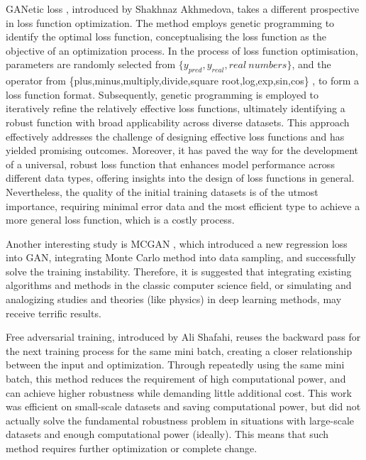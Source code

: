\documentclass{article}
\begin{document}
GANetic loss \cite{akhmedova2024ganeticlossgenerativeadversarial}, introduced by Shakhnaz Akhmedova, takes a different prospective in loss function optimization. The method employs genetic programming to identify the optimal loss function, conceptualising the loss function as the objective of an optimization process. In the process of loss function optimisation, parameters are randomly selected from $\{y_{pred}, y_{real}, real\ numbers\}$, and the operator from \{plus,minus,multiply,divide,square root,log,exp,sin,cos\} , to form a loss function format. Subsequently, genetic programming is employed to iteratively refine the relatively effective loss functions, ultimately identifying a robust function with broad applicability across diverse datasets. This approach effectively addresses the challenge of designing effective loss functions and has yielded promising outcomes. Moreover, it has paved the way for the development of a universal, robust loss function that enhances model performance across different data types, offering insights into the design of loss functions in general. Nevertheless, the quality of the initial training datasets is of the utmost importance, requiring minimal error data and the most efficient type to achieve a more general loss function, which is a costly process.

Another interesting study is MCGAN \cite{xiao2024mcganenhancinggantraining}, which introduced a new regression loss into GAN, integrating Monte Carlo method into data sampling, and successfully solve the training instability. Therefore, it is suggested that integrating existing algorithms and methods in the classic computer science field, or simulating and analogizing studies and theories (like physics) in deep learning methods, may receive terrific results.

Free adversarial training, introduced by Ali Shafahi, reuses the backward pass for the next training process for the same mini batch, creating a closer relationship between the input and optimization. Through repeatedly using the same mini batch, this method reduces the requirement of high computational power, and can achieve higher robustness while demanding little additional cost. This work was efficient on small-scale datasets and saving computational power, but did not actually solve the fundamental robustness problem in situations with large-scale datasets and enough computational power (ideally). This means that such method requires further optimization or complete change.
\end{document}
